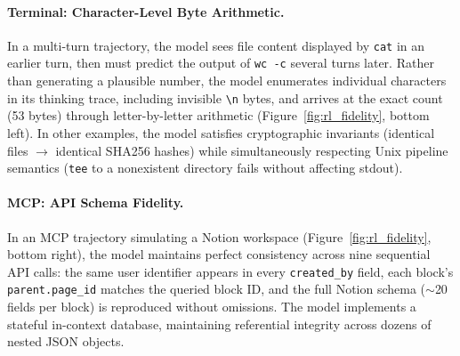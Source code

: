 \paragraph{Terminal: Character-Level Byte Arithmetic.}
In a multi-turn trajectory, the model sees file content displayed by \texttt{cat} in an earlier turn, then must predict the output of \texttt{wc -c} several turns later.
Rather than generating a plausible number, the model enumerates individual characters in its thinking trace, including invisible \texttt{\textbackslash n} bytes, and arrives at the exact count (53 bytes) through letter-by-letter arithmetic (Figure~\ref{fig:rl_fidelity}, bottom left).
In other examples, the model satisfies cryptographic invariants (identical files $\to$ identical SHA256 hashes) while simultaneously respecting Unix pipeline semantics (\texttt{tee} to a nonexistent directory fails without affecting stdout).

\paragraph{MCP: API Schema Fidelity.}
In an MCP trajectory simulating a Notion workspace (Figure~\ref{fig:rl_fidelity}, bottom right), the model maintains perfect consistency across nine sequential API calls: the same user identifier appears in every \texttt{created\_by} field, each block's \texttt{parent.page\_id} matches the queried block ID, and the full Notion schema ($\sim$20 fields per block) is reproduced without omissions.
The model implements a stateful in-context database, maintaining referential integrity across dozens of nested JSON objects.

